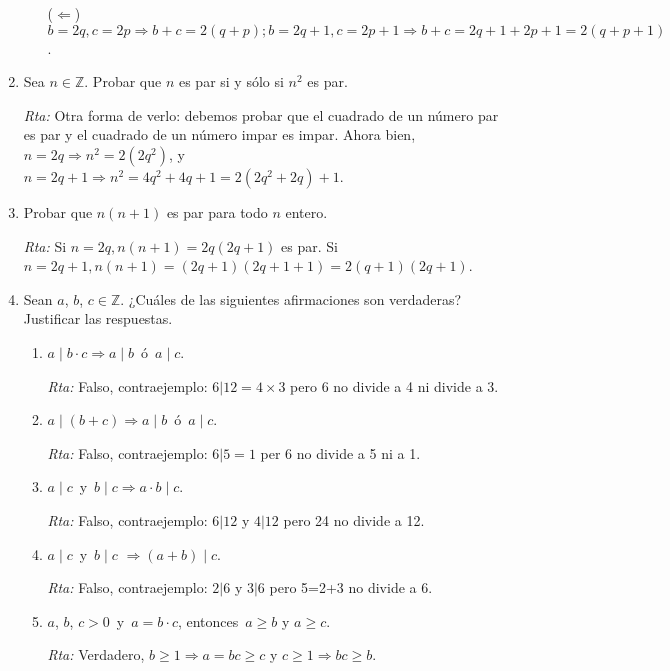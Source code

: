 \documentclass[a4paper,12pt,twoside,spanish,reqno]{amsbook}
\numberwithin{equation}{section}
\newcommand{\rta}{\noindent\textit{Rta: }}
\begin{document}
\begin{enumerate}
\begin{enumerate}
    ($\Leftarrow$)\, $b=2q, c=2p \Rightarrow b+c=2(q+p); b=2q+1, c=2p+1\Rightarrow b+c=2q+1+2p+1=2(q+p+1)$.
\end{enumerate}



\item Sea $n\in \mathbb Z$. Probar que $n$ es par si y s\'olo si $n^2$ es par.

\rta Otra forma de verlo: debemos probar que el cuadrado de un número par es par  y el cuadrado de un número impar es impar. Ahora bien, $n=2q \Rightarrow n^2=2(2q^2)$, y $n=2q+1\Rightarrow n^2=4q^2+4q+1=2(2q^2+2q)+1$.



\item Probar que $n(n+1)$ es par para todo $n$ entero.

\rta Si $ n=2q, n(n+1)=2q(2q+1)$ es par. Si $n=2q+1, n(n+1)=(2q+1)(2q+1+1)=2(q+1)(2q+1)$.



\item Sean $a$, $b$, $c \in {\mathbb Z}$. ¿Cuáles de las siguientes afirmaciones son verdaderas? Justificar las respuestas.
\begin{enumerate}
    \item $a \mid b\cdot c \Rightarrow a \mid b$\, \'o \,$a \mid c$.
    
    \rta Falso, contraejemplo: $6\vert12=4\times 3$ pero 6 no divide a 4 ni divide a 3.
    
    \item $a \mid (b+c) \Rightarrow a\mid b$\, \'o \,$a \mid c$.
    
    \rta Falso, contraejemplo: $6\vert 5=1$ per 6 no divide a 5 ni a 1.
    
    \item $a \mid c$\, y \,$b \mid c \Rightarrow a\cdot b \mid c$.
    
    \rta Falso, contraejemplo: $6\vert 12$ y $4\vert 12$ pero 24 no divide a 12.
    
    \item $a \mid c$\, y \,$b \mid c$ $\Rightarrow (a +b) \mid c$.
    
    \rta  Falso, contraejemplo: $2\vert 6$ y $3\vert 6$ pero 5=2+3 no divide a 6.
    
    \item $a$, $b$, $c>0$\, y \,$a=b\cdot c$, entonces  \,$a \ge b$ y $a \ge c$.
    
    \rta  Verdadero, $b\ge1 \Rightarrow a= bc\ge c$ y $ c\ge1 \Rightarrow bc\ge b$.
\end{enumerate}





\end{enumerate}
\end{document}
